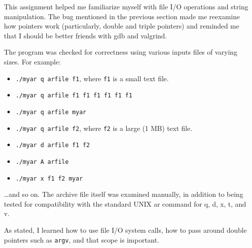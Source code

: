 \documentclass[12pt,letterpaper]{article}
\begin{document}
This assignment helped me familiarize myself with file I/O operations and
string manipulation. The bug mentioned in the previous section made me
reexamine how pointers work (particularly, double and triple pointers) and
reminded me that I should be better friends with gdb and valgrind.

The program was checked for correctness using various inputs files of varying
sizes. For example:

\begin{itemize}
	\item {\tt ./myar q arfile f1}, where {\tt f1} is a small text file.
	\item {\tt ./myar q arfile f1 f1 f1 f1 f1 f1}
	\item {\tt ./myar q arfile myar}
	\item {\tt ./myar q arfile f2}, where {\tt f2} is a large (1 MB) text file.
	\item {\tt ./myar d arfile f1 f2}
	\item {\tt ./myar A arfile}
	\item {\tt ./myar x f1 f2 myar}
\end{itemize}

\dots and so on. The archive file itself was examined manually, in addition to
being tested for compatibility with the standard UNIX ar command for q, d, x,
t, and v.

As stated, I learned how to use file I/O system calls, how to pass around double pointers such as {\tt argv}, and that scope is important.
\end{document}
